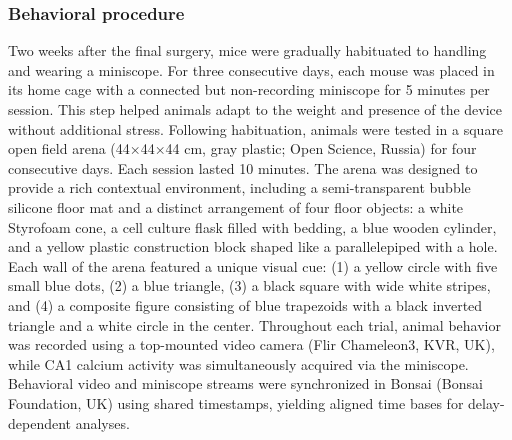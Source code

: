 \subsubsection{Behavioral procedure}
\label{sec:behavioral_procedure}
Two weeks after the final surgery, mice were gradually habituated to handling and wearing a miniscope. For three consecutive days, each mouse was placed in its home cage with a connected but non-recording miniscope for 5 minutes per session. This step helped animals adapt to the weight and presence of the device without additional stress. Following habituation, animals were tested in a square open field arena (44×44×44 cm, gray plastic; Open Science, Russia) for four consecutive days. Each session lasted 10 minutes. The arena was designed to provide a rich contextual environment, including a semi-transparent bubble silicone floor mat and a distinct arrangement of four floor objects: a white Styrofoam cone, a cell culture flask filled with bedding, a blue wooden cylinder, and a yellow plastic construction block shaped like a parallelepiped with a hole. Each wall of the arena featured a unique visual cue: (1) a yellow circle with five small blue dots, (2) a blue triangle, (3) a black square with wide white stripes, and (4) a composite figure consisting of blue trapezoids with a black inverted triangle and a white circle in the center. Throughout each trial, animal behavior was recorded using a top-mounted video camera (Flir Chameleon3, KVR, UK), while CA1 calcium activity was simultaneously acquired via the miniscope. Behavioral video and miniscope streams were synchronized in Bonsai (Bonsai Foundation, UK) using shared timestamps, yielding aligned time bases for delay-dependent analyses.

